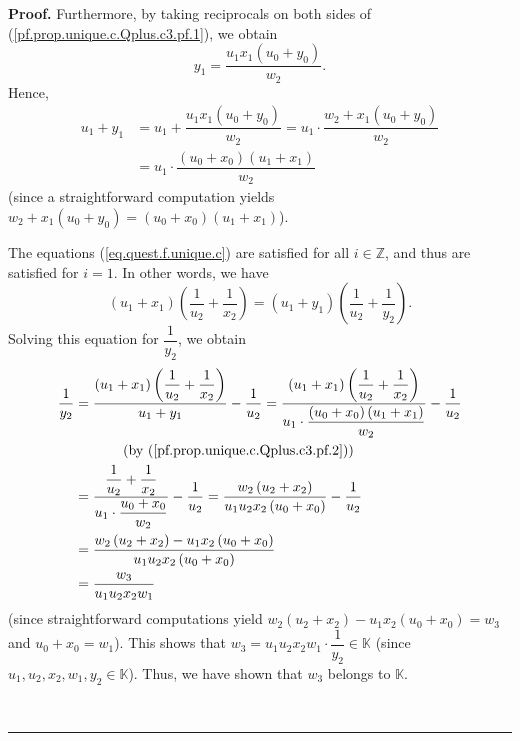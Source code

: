 \documentclass[numbers=enddot,12pt,final,onecolumn,notitlepage]{scrartcl}%
\theoremstyle{definition}
\newenvironment{proof}[1][Proof]{\noindent\textbf{#1.} }{\ \rule{0.5em}{0.5em}}
\newenvironment{verlong}{}{}
\begin{document}
\begin{verlong}
\begin{proof}
Furthermore, by taking reciprocals on both sides of
(\ref{pf.prop.unique.c.Qplus.c3.pf.1}), we obtain%
\[
y_{1}=\dfrac{u_{1}x_{1}\left(  u_{0}+y_{0}\right)  }{w_{2}}.
\]
Hence,%
\begin{align}
u_{1}+y_{1}  &  =u_{1}+\dfrac{u_{1}x_{1}\left(  u_{0}+y_{0}\right)  }{w_{2}%
}=u_{1}\cdot\dfrac{w_{2}+x_{1}\left(  u_{0}+y_{0}\right)  }{w_{2}}\nonumber\\
&  =u_{1}\cdot\dfrac{\left(  u_{0}+x_{0}\right)  \left(  u_{1}+x_{1}\right)
}{w_{2}} \label{pf.prop.unique.c.Qplus.c3.pf.2}%
\end{align}
(since a straightforward computation yields $w_{2}+x_{1}\left(  u_{0}%
+y_{0}\right)  =\left(  u_{0}+x_{0}\right)  \left(  u_{1}+x_{1}\right)  $).

The equations (\ref{eq.quest.f.unique.c}) are satisfied for all $i\in
\mathbb{Z}$, and thus are satisfied for $i=1$. In other words, we have%
\[
\left(  u_{1}+x_{1}\right)  \left(  \dfrac{1}{u_{2}}+\dfrac{1}{x_{2}}\right)
=\left(  u_{1}+y_{1}\right)  \left(  \dfrac{1}{u_{2}}+\dfrac{1}{y_{2}}\right)
.
\]
Solving this equation for $\dfrac{1}{y_{2}}$, we obtain%
\begin{align}
\dfrac{1}{y_{2}}  &  =\dfrac{\left(  u_{1}+x_{1}\right)  \left(  \dfrac
{1}{u_{2}}+\dfrac{1}{x_{2}}\right)  }{u_{1}+y_{1}}-\dfrac{1}{u_{2}}%
=\dfrac{\left(  u_{1}+x_{1}\right)  \left(  \dfrac{1}{u_{2}}+\dfrac{1}{x_{2}%
}\right)  }{u_{1}\cdot\dfrac{\left(  u_{0}+x_{0}\right)  \left(  u_{1}%
+x_{1}\right)  }{w_{2}}}-\dfrac{1}{u_{2}}\nonumber\\
&  \ \ \ \ \ \ \ \ \ \ \left(  \text{by (\ref{pf.prop.unique.c.Qplus.c3.pf.2}%
)}\right) \nonumber\\
&  =\dfrac{\dfrac{1}{u_{2}}+\dfrac{1}{x_{2}}}{u_{1}\cdot\dfrac{u_{0}+x_{0}%
}{w_{2}}}-\dfrac{1}{u_{2}}=\dfrac{w_{2}\left(  u_{2}+x_{2}\right)  }%
{u_{1}u_{2}x_{2}\left(  u_{0}+x_{0}\right)  }-\dfrac{1}{u_{2}}\nonumber\\
&  =\dfrac{w_{2}\left(  u_{2}+x_{2}\right)  -u_{1}x_{2}\left(  u_{0}%
+x_{0}\right)  }{u_{1}u_{2}x_{2}\left(  u_{0}+x_{0}\right)  }\nonumber\\
&  =\dfrac{w_{3}}{u_{1}u_{2}x_{2}w_{1}} \label{pf.prop.unique.c.Qplus.c3.pf.3}%
\end{align}
(since straightforward computations yield $w_{2}\left(  u_{2}+x_{2}\right)
-u_{1}x_{2}\left(  u_{0}+x_{0}\right)  =w_{3}$ and $u_{0}+x_{0}=w_{1}$). This
shows that $w_{3}=u_{1}u_{2}x_{2}w_{1}\cdot\dfrac{1}{y_{2}}\in\mathbb{K}$
(since $u_{1},u_{2},x_{2},w_{1},y_{2}\in\mathbb{K}$). Thus, we have shown that
$w_{3}$ belongs to $\mathbb{K}$.


\end{proof}
\end{verlong}
\end{document}
